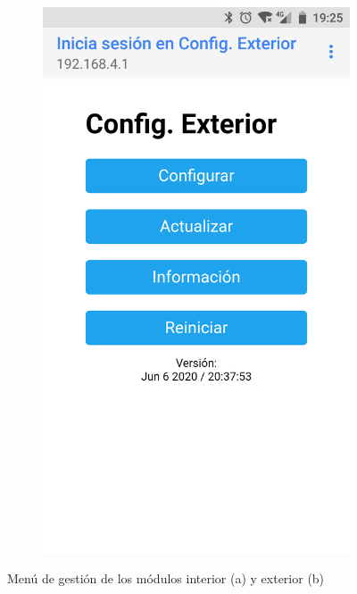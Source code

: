 \begin{figure}
\begin{subfigure}{0.49\columnwidth}
  \includegraphics[width=1\columnwidth,frame]{images/exterior-menu}
  \caption{}
  \label{fig:exterior-menu}
\end{subfigure}
\caption{Menú de gestión de los módulos interior (a) y exterior (b)}
\label{fig:menu}
\end{figure}

